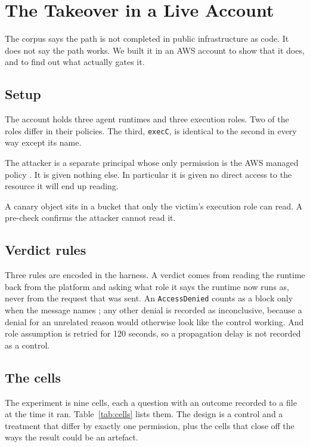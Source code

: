 \section{The Takeover in a Live Account}
\label{sec:case-study}

The corpus says the path is not completed in public infrastructure as code.
It does not say the path works. We built it in an AWS account to show that it
does, and to find out what actually gates it.

\subsection{Setup}

The account holds three agent runtimes and three execution roles. Two of the
roles differ in their policies. The third, \texttt{execC}, is identical to the
second in every way except its name.

The attacker is a separate principal whose only permission is the AWS managed
policy . It is given nothing else. In
particular it is given no direct access to the resource it will end up
reading.

A canary object sits in a bucket that only the victim's execution role can
read. A pre-check confirms the attacker cannot read it.

\subsection{Verdict rules}

Three rules are encoded in the harness. A verdict comes from reading the
runtime back from the platform and asking what role it says the runtime now
runs as, never from the request that was sent. An \texttt{AccessDenied} counts
as a block only when the message names ; any other denial is
recorded as inconclusive, because a denial for an unrelated reason would
otherwise look like the control working. And role assumption is retried for
120 seconds, so a propagation delay is not recorded as a control.



\subsection{The cells}

The experiment is nine cells, each a question with an outcome recorded to a
file at the time it ran. Table~\ref{tab:cells} lists them. The design is a
control and a treatment that differ by exactly one permission, plus the cells
that close off the ways the result could be an artefact.


